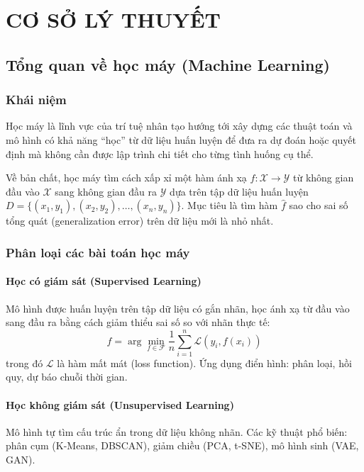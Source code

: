 \documentclass[12pt,a4paper]{report}
\begin{document}
\cleardoublepage

\chapter{CƠ SỞ LÝ THUYẾT}

\section{Tổng quan về học máy (Machine Learning)}

\subsection{Khái niệm}
Học máy là lĩnh vực của trí tuệ nhân tạo hướng tới xây dựng các thuật toán và mô hình có khả năng ``học'' từ dữ liệu huấn luyện để đưa ra dự đoán hoặc quyết định mà không cần được lập trình chi tiết cho từng tình huống cụ thể.

Về bản chất, học máy tìm cách xấp xỉ một hàm ánh xạ $f: \mathcal{X} \rightarrow \mathcal{Y}$ từ không gian đầu vào $\mathcal{X}$ sang không gian đầu ra $\mathcal{Y}$ dựa trên tập dữ liệu huấn luyện $D = \{(x_1, y_1), (x_2, y_2), \ldots, (x_n, y_n)\}$. Mục tiêu là tìm hàm $\hat{f}$ sao cho sai số tổng quát (generalization error) trên dữ liệu mới là nhỏ nhất.

\subsection{Phân loại các bài toán học máy}

\subsubsection{Học có giám sát (Supervised Learning)}
Mô hình được huấn luyện trên tập dữ liệu có gắn nhãn, học ánh xạ từ đầu vào sang đầu ra bằng cách giảm thiểu sai số so với nhãn thực tế:
\[
    \hat{f} = \arg\min_{f \in \mathcal{F}} \frac{1}{n}\sum_{i=1}^{n} \mathcal{L}(y_i, f(x_i))
\]
trong đó $\mathcal{L}$ là hàm mất mát (loss function). Ứng dụng điển hình: phân loại, hồi quy, dự báo chuỗi thời gian.

\subsubsection{Học không giám sát (Unsupervised Learning)}
Mô hình tự tìm cấu trúc ẩn trong dữ liệu không nhãn. Các kỹ thuật phổ biến: phân cụm (K-Means, DBSCAN), giảm chiều (PCA, t-SNE), mô hình sinh (VAE, GAN).
\end{document}
